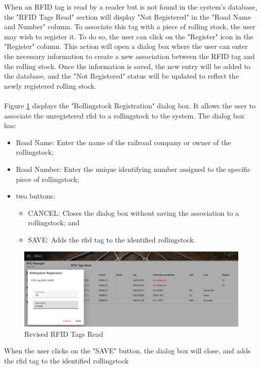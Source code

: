 When an RFID tag is read by a reader but is not found in the system's database, the "RFID Tags Read" section will display 
"Not Registered" in the "Road Name and Number" column. To associate this tag with a piece of rolling stock, the user may wish 
to register it. To do so, the user can click on the "Register" icon in the "Register" column. This action will open a dialog 
box where the user can enter the necessary information to create a new association between the RFID tag and the rolling stock. 
Once the information is saved, the new entry will be added to the database, and the "Not Registered" status will be updated to 
reflect the newly registered rolling stock.\\
\\
Figure \ref{fig:reader3} displays the "Rollingstock Registration" dialog box. It allows the user to associate the unregistered 
\gls{rfid} to a rollingstock to the system. The dialog box has:
\begin{itemize}
    \item Road Name: Enter the name of the railroad company or owner of the rollingstock;
    \item Road Number: Enter the unique identifying number assigned to the specific piece of rollingstock;
    \item two buttons:
    \begin{itemize}
        \item CANCEL: Closes the dialog box without saving the association to a rollingstock; and
        \item SAVE: Adds the \gls{rfid} tag to the identified rollingstock.
    \end{itemize}
\end{itemize}
\begin{figure}[H]
    \centering
    \includegraphics[scale=0.33]{./images/reader2.png}
    \caption{Revised RFID Tags Read}
    \label{fig:reader3}
\end{figure}
When the user clicks on the "SAVE" button, the dialog box will close, and adds the \gls{rfid} tag to the identified rollingstock 
